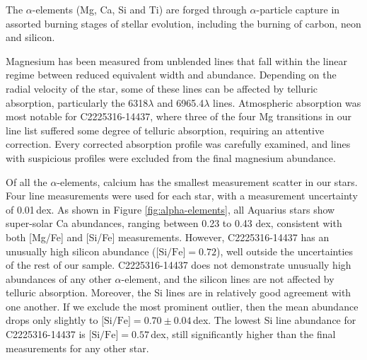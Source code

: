 \documentclass{emulateapj}
\begin{document}
The $\alpha$-elements (Mg, Ca, Si and Ti) are forged through $\alpha$-particle capture in assorted burning stages of stellar evolution, including the burning of carbon, neon and silicon.

Magnesium has been measured from unblended lines that fall within the linear regime between reduced equivalent width and abundance. Depending on the radial velocity of the star, some of these lines can be affected by telluric absorption, particularly the 6318$\lambda$ and 6965.4$\lambda$ lines. Atmospheric absorption was most notable for C2225316-14437, where three of the four Mg transitions in our line list suffered some degree of telluric absorption, requiring an attentive correction. Every corrected absorption profile was carefully examined, and lines with suspicious profiles were excluded from the final magnesium abundance.

Of all the $\alpha$-elements, calcium has the smallest measurement scatter in our stars. Four line measurements were used for each star, with a measurement uncertainty of 0.01\,dex. As shown in Figure \ref{fig:alpha-elements}, all Aquarius stars show super-solar Ca abundances, ranging between 0.23 to 0.43 dex, consistent with both [Mg/Fe] and [Si/Fe] measurements. However, C2225316-14437 has an unusually high silicon abundance ($\mbox{[Si/Fe]} = 0.72$), well outside the uncertainties of the rest of our sample. C2225316-14437 does not demonstrate unusually high abundances of any other $\alpha$-element, and the silicon lines are not affected by telluric absorption. Moreover, the Si lines are in relatively good agreement with one another. If we exclude the most prominent outlier, then the mean abundance drops only slightly to $\mbox{[Si/Fe]} = 0.70 \pm 0.04$\,dex. The lowest Si line abundance for C2225316-14437 is $\mbox{[Si/Fe]} = 0.57$\,dex, still significantly higher than the final measurements for any other star.


\end{document}
